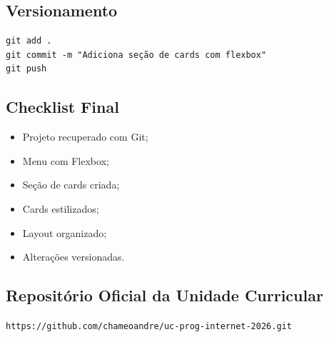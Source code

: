 \documentclass[12pt,a4paper]{article}
\begin{document}
\subsection{Versionamento}

\begin{boxCodigo}
\begin{verbatim}
git add .
git commit -m "Adiciona seção de cards com flexbox"
git push
\end{verbatim}
\end{boxCodigo}


\subsection{Checklist Final}

\begin{boxAtividade}

\begin{itemize}
\item Projeto recuperado com Git;
\item Menu com Flexbox;
\item Seção de cards criada;
\item Cards estilizados;
\item Layout organizado;
\item Alterações versionadas.
\end{itemize}

\end{boxAtividade}


\subsection{Repositório Oficial da Unidade Curricular}

\begin{tcolorbox}[
colback=azulTitulo!5,
colframe=azulTitulo,
title=\textbf{Repositório Oficial da Disciplina}
]

\begin{center}
\end{center}

\begin{center}
\texttt{https://github.com/chameoandre/uc-prog-internet-2026.git}
\end{center}

\end{tcolorbox}
\end{document}
